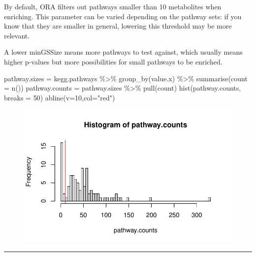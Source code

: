 \documentclass[
  24px,
  letterpaper,
  DIV=11,
  numbers=noendperiod]{scrartcl}
\newenvironment{Shaded}{\begin{snugshade}}{\end{snugshade}}
\newcommand{\AttributeTok}[1]{\textcolor[rgb]{0.40,0.45,0.13}{#1}}
\newcommand{\DecValTok}[1]{\textcolor[rgb]{0.68,0.00,0.00}{#1}}
\newcommand{\FunctionTok}[1]{\textcolor[rgb]{0.28,0.35,0.67}{#1}}
\newcommand{\NormalTok}[1]{\textcolor[rgb]{0.00,0.23,0.31}{#1}}
\newcommand{\OtherTok}[1]{\textcolor[rgb]{0.00,0.23,0.31}{#1}}
\newcommand{\SpecialCharTok}[1]{\textcolor[rgb]{0.37,0.37,0.37}{#1}}
\newcommand{\StringTok}[1]{\textcolor[rgb]{0.13,0.47,0.30}{#1}}
\begin{document}
By default, ORA filters out pathways smaller than 10 metabolites when
enriching. This parameter can be varied depending on the pathway sets:
if you know that they are smaller in general, lowering this threshold
may be more relevant.

A lower minGSSize means more pathways to test against, which usually
means higher p-values but more possibilities for small pathways to be
enriched.

\begin{Shaded}
\begin{Highlighting}[]
\NormalTok{pathway.sizes }\OtherTok{=}\NormalTok{ kegg.pathways }\SpecialCharTok{\%\textgreater{}\%} \FunctionTok{group\_by}\NormalTok{(value.x) }\SpecialCharTok{\%\textgreater{}\%} \FunctionTok{summarise}\NormalTok{(}\AttributeTok{count =} \FunctionTok{n}\NormalTok{()) }
\NormalTok{pathway.counts }\OtherTok{=}\NormalTok{ pathway.sizes }\SpecialCharTok{\%\textgreater{}\%} \FunctionTok{pull}\NormalTok{(count)}
\FunctionTok{hist}\NormalTok{(pathway.counts, }\AttributeTok{breaks =} \DecValTok{50}\NormalTok{)}
\FunctionTok{abline}\NormalTok{(}\AttributeTok{v=}\DecValTok{10}\NormalTok{,}\AttributeTok{col=}\StringTok{"red"}\NormalTok{)}
\end{Highlighting}
\end{Shaded}

\begin{figure}[H]

{\centering \includegraphics{index_files/figure-pdf/unnamed-chunk-25-1.pdf}

}

\end{figure}

\begin{center}\rule{0.5\linewidth}{0.5pt}\end{center}
\end{document}
